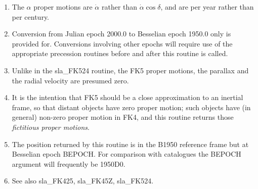 {
  \\
  \\
}
{
  \\
  \\
  \\
}
\notes
{
 \begin{enumerate}
  \item The $\alpha$ proper motions are $\dot{\alpha}$ rather than
        $\dot{\alpha}\cos\delta$, and are per year rather than per century.
  \item Conversion from Julian epoch 2000.0 to Besselian epoch 1950.0
       only is provided for.  Conversions involving other epochs will
       require use of the appropriate precession routines before and
       after this routine is called.
  \item Unlike in the sla\_FK524 routine, the FK5 proper motions, the
       parallax and the radial velocity are presumed zero.
  \item It is the intention that FK5 should be a close approximation
       to an inertial frame, so that distant objects have zero proper
       motion;  such objects have (in general) non-zero proper motion
       in FK4, and this routine returns those {\it fictitious proper
       motions}.
  \item The position returned by this routine is in the B1950
       reference frame but at Besselian epoch BEPOCH.  For
       comparison with catalogues the BEPOCH argument will
       frequently be 1950D0.
  \item See also sla\_FK425, sla\_FK45Z, sla\_FK524.
 \end{enumerate}
}
{
}
{
  \\
  \\
}
